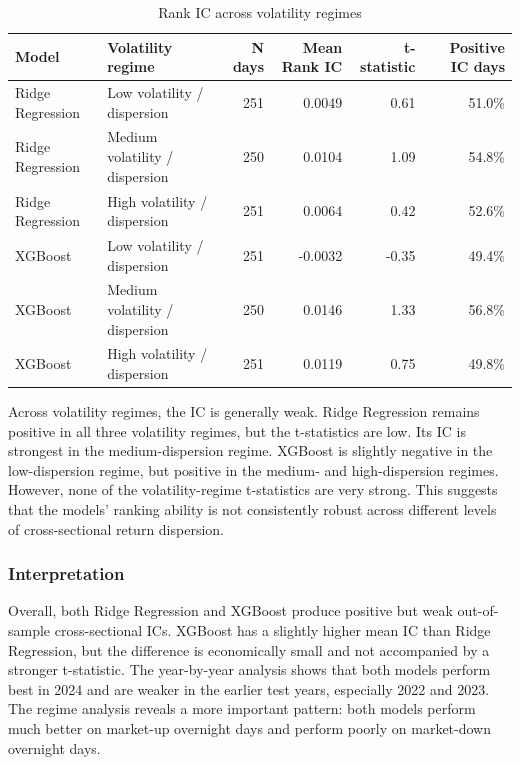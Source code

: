\documentclass[12pt]{article}
\begin{document}
\begin{table}[htbp]
\centering
\small
\caption{Rank IC across volatility regimes}
\label{tab:volatility_ic}
\begin{tabular}{llrrrr}
\toprule
Model & Volatility regime & N days & Mean Rank IC & t-statistic & Positive IC days \\
\midrule
Ridge Regression & Low volatility / dispersion & 251 & 0.0049 & 0.61 & 51.0\% \\
Ridge Regression & Medium volatility / dispersion & 250 & 0.0104 & 1.09 & 54.8\% \\
Ridge Regression & High volatility / dispersion & 251 & 0.0064 & 0.42 & 52.6\% \\
\midrule
XGBoost & Low volatility / dispersion & 251 & -0.0032 & -0.35 & 49.4\% \\
XGBoost & Medium volatility / dispersion & 250 & 0.0146 & 1.33 & 56.8\% \\
XGBoost & High volatility / dispersion & 251 & 0.0119 & 0.75 & 49.8\% \\
\bottomrule
\end{tabular}
\end{table}

Across volatility regimes, the IC is generally weak. Ridge Regression remains positive in all three volatility regimes, but the t-statistics are low. Its IC is strongest in the medium-dispersion regime. XGBoost is slightly negative in the low-dispersion regime, but positive in the medium- and high-dispersion regimes. However, none of the volatility-regime t-statistics are very strong. This suggests that the models' ranking ability is not consistently robust across different levels of cross-sectional return dispersion.

\subsubsection{Interpretation}

Overall, both Ridge Regression and XGBoost produce positive but weak out-of-sample cross-sectional ICs. XGBoost has a slightly higher mean IC than Ridge Regression, but the difference is economically small and not accompanied by a stronger t-statistic. The year-by-year analysis shows that both models perform best in 2024 and are weaker in the earlier test years, especially 2022 and 2023. The regime analysis reveals a more important pattern: both models perform much better on market-up overnight days and perform poorly on market-down overnight days.
\end{document}
